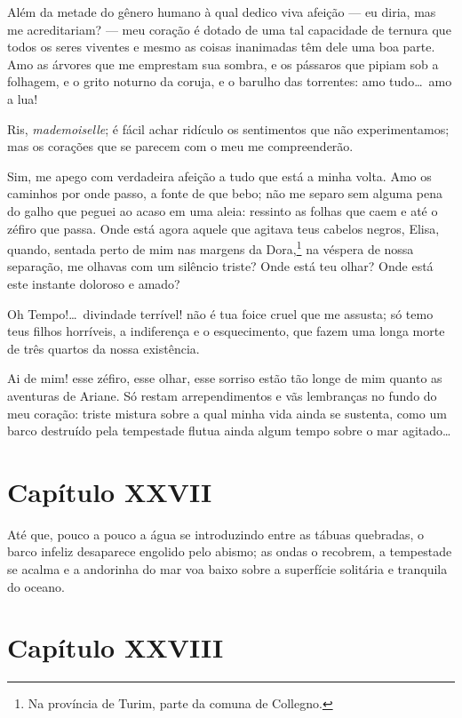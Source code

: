   Além da metade do gênero humano à qual dedico viva afeição --- eu
diria, mas me acreditariam? --- meu coração é dotado de uma tal
capacidade de ternura que todos os seres viventes e mesmo as coisas
inanimadas têm dele uma boa parte. Amo as árvores que me emprestam sua
sombra, e os pássaros que pipiam sob a folhagem, e o grito noturno da
coruja, e o barulho das torrentes: amo tudo\ldots\ amo a lua!

 Ris, \textit{mademoiselle}; é fácil achar ridículo os sentimentos que
não experimentamos; mas os corações que se parecem com o meu me
compreenderão.

 Sim, me apego com verdadeira afeição a tudo que está a minha volta. Amo
os caminhos por onde passo, a fonte de que bebo; não me separo sem
alguma pena do galho que peguei ao acaso em uma aleia: ressinto as
folhas que caem e até o zéfiro que passa. Onde está agora aquele que
agitava teus cabelos negros, Elisa, quando, sentada perto de mim nas
margens da Dora,\footnote{ Na província de Turim, parte da comuna de
Collegno.} na véspera de nossa separação, me olhavas com um silêncio
triste? Onde está teu olhar? Onde está este instante doloroso e amado?

 Oh Tempo!\ldots\ divindade terrível! não é tua foice cruel que me assusta;
só temo teus filhos horríveis, a indiferença e o esquecimento, que
fazem uma longa morte de três quartos da nossa existência. 

 Ai de mim! esse zéfiro, esse olhar, esse sorriso estão tão longe de mim
quanto as aventuras de Ariane. Só restam arrependimentos e vãs
lembranças no fundo do meu coração: triste mistura sobre a qual minha
vida ainda se sustenta, como um barco destruído pela tempestade flutua
ainda algum tempo sobre o mar agitado\ldots

\section*{Capítulo XXVII}

 Até que, pouco a pouco a água se introduzindo entre as tábuas
quebradas, o barco infeliz desaparece engolido pelo abismo; as ondas o
recobrem, a tempestade se acalma e a andorinha do mar voa baixo sobre a
superfície solitária e tranquila do oceano.

\section*{Capítulo XXVIII}

